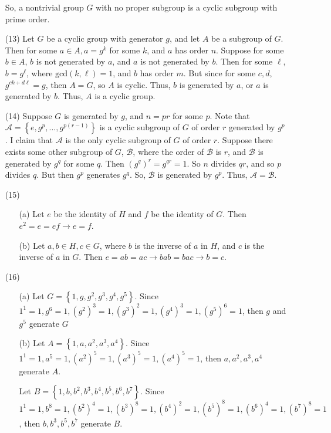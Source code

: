 \begin{itemize}
So, a nontrivial group $G$ with no proper subgroup is a cyclic subgroup with prime order.
\item[(13)]
Let $G$ be a cyclic group with generator $g$, and let $A$ be a subgroup of $G$. Then for some $a \in A, a = g^k$ for some $k$, and $a$ has order $n$. Suppose for some $b \in A$, $b$ is not generated by $a$, and $a$ is not generated by $b$. Then for some $\ell$, $b = g^\ell$, where $\text{gcd}(k, \ell) = 1$, and $b$ has order $m$. But since for some $c, d$, $g^{ck + d\ell} = g$, then $A = G$, so $A$ is cyclic. Thus, $b$ is generated by $a$, or $a$ is generated by $b$. Thus, $A$ is a cyclic group.
\item[(14)]
Suppose $G$ is generated by $g$, and $n = pr$ for some $p$. Note that $\mathcal{A} = \left\lbrace e, g^p, ..., g^{p(r-1)} \right\rbrace$ is a cyclic subgroup of $G$ of order $r$ generated by $g^p$. I claim that $\mathcal{A}$ is the only cyclic subgroup of $G$ of order $r$. Suppose there exists some other subgroup of $G$, $\mathcal{B}$, where the order of $\mathcal{B}$ is $r$, and $\mathcal{B}$ is generated by $g^q$ for some $q$. Then $(g^q)^r = g^{qr} = 1$. So $n$ divides $qr$, and so $p$ divides $q$. But then $g^p$ generates $g^q$. So, $\mathcal{B}$ is generated by $g^p$. Thus, $\mathcal{A} = \mathcal{B}$.
\item[(15)]
\begin{itemize}
\item[(a)]
Let $e$ be the identity of $H$ and $f$ be the identity of $G$. Then $e^2 = e = ef \rightarrow e = f$.
\item[(b)]
Let $a, b \in H, c \in G$, where $b$ is the inverse of $a$ in $H$, and $c$ is the inverse of $a$ in $G$. Then $e = ab = ac \rightarrow bab = bac \rightarrow b = c$.
\end{itemize}
\item[(16)]
\begin{itemize}
\item[(a)]
Let $G = \left\lbrace 1, g, g^2, g^3, g^4, g^5 \right\rbrace$. Since $1^1 = 1, g^6 = 1, (g^2)^3 = 1, (g^3)^2 = 1, (g^4)^3 = 1, (g^5)^6 = 1$, then $g$ and $g^5$ generate $G$
\item[(b)]
Let $A = \left\lbrace 1, a, a^2, a^3, a^4 \right\rbrace$. Since $1^1 = 1, a^5 = 1, (a^2)^5 = 1, (a^3)^5 = 1, (a^4)^5 = 1$, then $a, a^2, a^3, a^4$ generate $A$.

Let $B = \left\lbrace 1, b, b^2, b^3, b^4, b^5, b^6, b^7 \right\rbrace$. Since $1^1 = 1, b^8 = 1, (b^2)^4 = 1, (b^3)^8 = 1, (b^4)^2 = 1, (b^5)^8 = 1, (b^6)^4 = 1, (b^7)^8 = 1$, then $b, b^3, b^5, b^7$ generate $B$.


\end{itemize}
\end{itemize}
